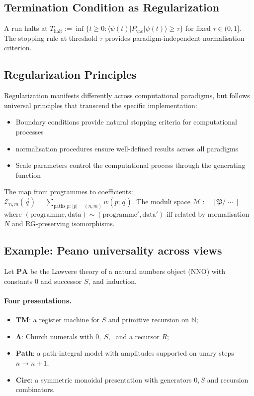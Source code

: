 \subsection{Termination Condition as Regularization}

A run halts at $T_{\text{halt}} := \inf\{t \geq 0 : \langle \psi(t)|P_{\mathrm{vac}}|\psi(t)\rangle \geq \tau\}$ for fixed $\tau\in(0,1]$. The stopping rule at threshold $\tau$ provides paradigm-independent normalisation criterion.

\subsection{Regularization Principles}

Regularization manifests differently across computational paradigms, but follows universal principles that transcend the specific implementation:

\begin{itemize}
\item Boundary conditions provide natural stopping criteria for computational processes
\item normalisation procedures ensure well-defined results across all paradigms
\item Scale parameters control the computational process through the generating function
\end{itemize}

\begin{definition}
\label{def:programme-coefficient-map}
The map from programmes to coefficients: $\mathcal{Z}_{n,m}(\vec{q}) = \sum_{\text{paths }p:\,|p|=(n,m)} w(p;\vec{q})$. The moduli space $\mathcal{M} := [\mathfrak{P} / \sim]$ where $(\text{programme},\text{data})\sim(\text{programme}',\text{data}')$ iff related by normalisation $N$ and RG-preserving isomorphisms.
\end{definition}

\subsection{Example: Peano universality across views}
\label{subsec:peano-moduli}
Let $\mathbf{PA}$ be the Lawvere theory of a natural numbers object (NNO)
with constants $0$ and successor $S$, and induction.

\paragraph{Four presentations.}
\begin{itemize}
\item $\mathbf{TM}$: a register machine for $S$ and primitive recursion on $\mathbb{N}$;
\item $\mathbf{\Lambda}$: Church numerals with $0,\;S,\;$ and a recursor $R$;
\item $\mathbf{Path}$: a path-integral model with amplitudes supported on unary steps $n\to n+1$;
\item $\mathbf{Circ}$: a symmetric monoidal presentation with generators $0,S$ and recursion combinators.
\end{itemize}

